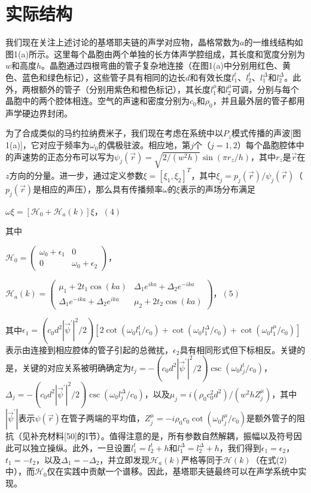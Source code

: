 \section{实际结构}

我们现在关注上述讨论的基塔耶夫链的声学对应物，晶格常数为\(a\)的一维线结构如图1(a)所示。这里每个晶胞由两个单独的长方体声学腔组成，其长度和宽度分别为\(w\)和高度\(h\)。晶胞通过四根弯曲的管子复杂地连接（在图1(a)中分别用红色、黄色、蓝色和绿色标记），这些管子具有相同的边长\(d\)和有效长度\(l_{1}^{t}\)、\(l_{2}^{t}\)、\(l_{1}^{\Delta}\)和\(l_{2}^{\Delta}\)。此外，两根额外的管子（分别用紫色和橙色标记），其长度\(l_{1}^{\mu}\)和\(l_{2}^{\mu}\)可调，分别与每个晶胞中的两个腔体相连。空气的声速和密度分别为\(c_{0}\)和\(\rho_{0}\)，并且最外层的管子都用声学硬边界封闭。

为了合成类似的马约拉纳费米子，我们现在考虑在系统中以\(P_{z}\)模式传播的声波[图1(a)]，它对应于频率为\(\omega_{0}\)的偶极驻波。相应地，第\(j\)个（\(j = 1,2\)）每个晶胞腔体中的声速势的正态分布可以写为\(\psi_{j}(\vec{r}) = \sqrt{2 /(w^{2} h)} \sin(\pi r_{z} / h)\)，其中\(r_{z}\)是\(\vec{r}\)在\(z\)方向的分量。进一步，通过定义参数\(\xi = [\xi_{1}, \xi_{2}]^{T}\)，其中\(\xi_{j} = p_{j}(\vec{r}) / \psi_{j}(\vec{r})\)（\(p_{j}(\vec{r})\)是相应的声压），那么具有传播频率\(\omega\)的\(\xi\)表示的声场分布满足

\(\omega \xi = [\mathcal{H}_{0} + \mathcal{H}_{a}(k)] \xi\)，\((4)\)

其中

\(\mathcal{H}_{0} = \begin{pmatrix} \omega_{0} + \epsilon_{1} & 0 \\ 0 & \omega_{0} + \epsilon_{2} \end{pmatrix}\)，

\(\mathcal{H}_{a}(k) = \begin{pmatrix} \mu_{1} + 2t_{1} \cos(ka) & \Delta_{1} e^{ika} + \Delta_{2} e^{-ika} \\ \Delta_{1} e^{-ika} + \Delta_{2} e^{ika} & \mu_{2} + 2t_{2} \cos(ka) \end{pmatrix}\)，\((5)\)

其中\(\epsilon_{1} = (c_{0} d^{2}|\vec{\psi}^{\prime}|^{2} / 2)[2 \cot(\omega_{0} l_{1}^{t} / c_{0}) + \cot(\omega_{0} l_{1}^{\Delta} / c_{0}) + \cot(\omega_{0} l_{1}^{\mu} / c_{0})]\)表示由连接到相应腔体的管子引起的总微扰，\(\epsilon_{2}\)具有相同形式但下标相反。关键的是，关键的对应关系被明确确定为\(t_{j} = -(c_{0} d^{2}|\vec{\psi}^{\prime}|^{2} / 2) \csc(\omega_{0} l_{j}^{t} / c_{0})\)，\(\Delta_{j} = -(c_{0} d^{2}|\vec{\psi}^{\prime}|^{2} / 2) \csc(\omega_{0} l_{j}^{\Delta} / c_{0})\)，以及\(\mu_{j} = i(\rho_{0} c_{0}^{2} d^{2}) /(w^{2} h Z_{j}^{\mu})\)，其中\(|\vec{\psi}^{\prime}|\)表示\(\psi(\vec{r})\)在管子两端的平均值，\(Z_{j}^{\mu} = -i \rho_{0} c_{0} \cot(\omega_{0} l_{j}^{\mu} / c_{0})\)是额外管子的阻抗（见补充材料[50]的I节）。值得注意的是，所有参数自然解耦，振幅以及符号因此可以独立操纵。此外，一旦设置\(l_{1}^{t} = l_{2}^{t} + h\)和\(l_{1}^{\Delta} = l_{2}^{\Delta} + h\)，我们得到\(\epsilon_{1} = \epsilon_{2}\)，\(t_{1} = -t_{2}\)，以及\(\Delta_{1} = -\Delta_{2}\)，并立即发现\(\mathcal{H}_{a}(k)\)严格等同于\(\mathcal{H}(k)\)（在式(2)中），而\(\mathcal{H}_{0}\)仅在实践中贡献一个谱移。因此，基塔耶夫链最终可以在声学系统中实现。

